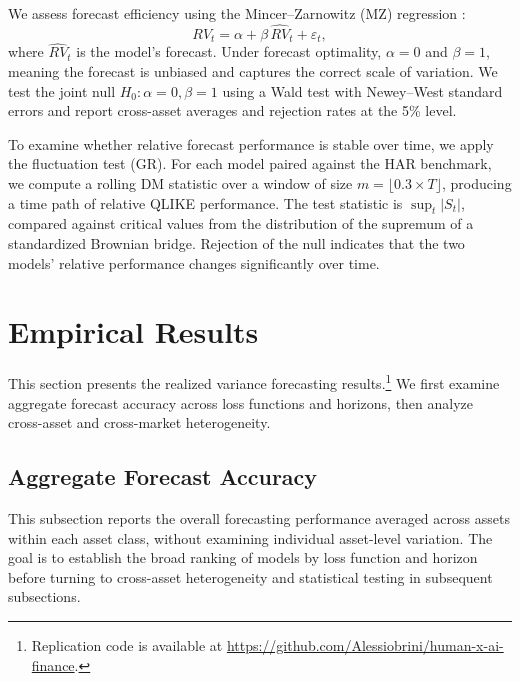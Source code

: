 \documentclass[12pt]{article}
\begin{document}
We assess forecast efficiency using the Mincer--Zarnowitz (MZ) regression \citep{mincer1969}:
\begin{equation}
  RV_t = \alpha + \beta \, \widehat{RV}_t + \varepsilon_t,
  \label{eq:mz}
\end{equation}
where $\widehat{RV}_t$ is the model's forecast. Under forecast optimality, $\alpha = 0$ and $\beta = 1$, meaning the forecast is unbiased and captures the correct scale of variation. We test the joint null $H_0\!: \alpha = 0, \beta = 1$ using a Wald test with Newey--West standard errors and report cross-asset averages and rejection rates at the 5\% level.

To examine whether relative forecast performance is stable over time, we apply the \citet{giacomini2010} fluctuation test (GR). For each model paired against the HAR benchmark, we compute a rolling DM statistic over a window of size $m = \lfloor 0.3 \times T \rfloor$, producing a time path of relative QLIKE performance. The test statistic is $\sup_t |S_t|$, compared against critical values from the distribution of the supremum of a standardized Brownian bridge. Rejection of the null indicates that the two models' relative performance changes significantly over time.

\section{Empirical Results}
\label{sec:results}

This section presents the realized variance forecasting results.\footnote{Replication code is available at \url{https://github.com/Alessiobrini/human-x-ai-finance}.} We first examine aggregate forecast accuracy across loss functions and horizons, then analyze cross-asset and cross-market heterogeneity.

\subsection{Aggregate Forecast Accuracy}
\label{subsec:main_results}

This subsection reports the overall forecasting performance averaged across assets within each asset class, without examining individual asset-level variation. The goal is to establish the broad ranking of models by loss function and horizon before turning to cross-asset heterogeneity and statistical testing in subsequent subsections.
\end{document}
